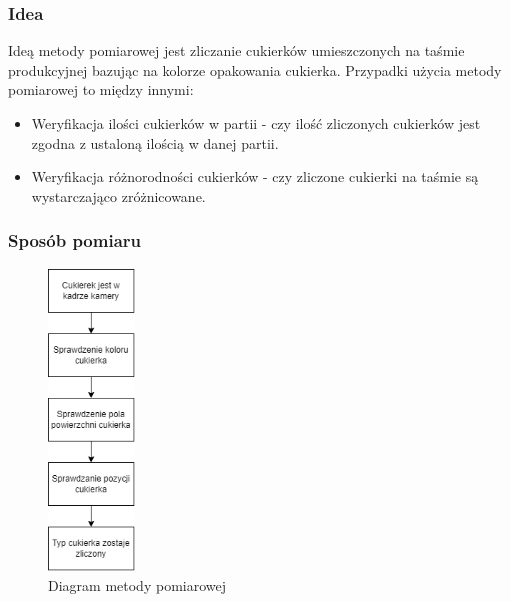 \documentclass{article}
\begin{document}
\subsubsection{Idea}
\label{Idea}

Ideą metody pomiarowej jest zliczanie cukierków umieszczonych na taśmie produkcyjnej bazując na kolorze opakowania cukierka. Przypadki użycia metody pomiarowej to między innymi:

\begin{itemize}
    \item Weryfikacja ilości cukierków w partii - czy ilość zliczonych cukierków jest zgodna z ustaloną ilością w danej partii.
    \item Weryfikacja różnorodności cukierków - czy zliczone cukierki na taśmie są wystarczająco zróżnicowane.
\end{itemize}

\subsubsection{Sposób pomiaru}
\label{Sposób pomiaru}

\begin{figure}[H]
    \centering
    \includegraphics[height=8cm]{diagramMetody.png}
    \caption{Diagram metody pomiarowej}
    \label{fig:diagramMetody}
\end{figure}
\end{document}
